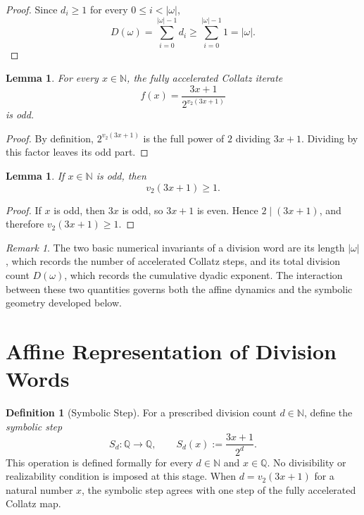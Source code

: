\documentclass[12pt, oneside]{article}
\numberwithin{equation}{section}
\theoremstyle{definition}
\newtheorem{definition}{Definition}[section]
\theoremstyle{plain}
\newtheorem{lemma}[theorem]{Lemma}
\theoremstyle{remark}
\newtheorem*{remark}{Remark}
\begin{document}
\begin{proof}
Since $d_i\ge1$ for every $0\le i<|\omega|$,
\[
D(\omega)
=\sum_{i=0}^{|\omega|-1} d_i
\ge
\sum_{i=0}^{|\omega|-1}1
=
|\omega|.
\]
\end{proof}

\begin{lemma}
For every \(x\in\mathbb{N}\), the fully accelerated Collatz iterate
\[
f(x)=\frac{3x+1}{2^{v_2(3x+1)}}
\]
is odd.
\end{lemma}

\begin{proof}
By definition, \(2^{v_2(3x+1)}\) is the full power of \(2\) dividing
\(3x+1\). Dividing by this factor leaves its odd part.
\end{proof}

\begin{lemma}
If \(x\in\mathbb{N}\) is odd, then
\[
v_2(3x+1)\ge 1.
\]
\end{lemma}

\begin{proof}
If \(x\) is odd, then \(3x\) is odd, so \(3x+1\) is even. Hence
\(2\mid(3x+1)\), and therefore \(v_2(3x+1)\ge1\).
\end{proof}

\begin{remark}
The two basic numerical invariants of a division word are its length
\(|\omega|\), which records the number of accelerated Collatz steps, and
its total division count \(D(\omega)\), which records the cumulative
dyadic exponent. The interaction between these two quantities governs
both the affine dynamics and the symbolic geometry developed below.
\end{remark}


\section{Affine Representation of Division Words}
\label{sec:affine-representation}

\begin{definition}[Symbolic Step]

For a prescribed division count \(d\in\mathbb{N}\), define the
\emph{symbolic step}
\[
S_d:\mathbb{Q}\to\mathbb{Q},
\qquad
S_d(x):=\frac{3x+1}{2^d}.
\]
This operation is defined formally for every \(d\in\mathbb{N}\) and
\(x\in\mathbb{Q}\). No divisibility or realizability condition is imposed
at this stage. When \(d=v_2(3x+1)\) for a natural number \(x\), the
symbolic step agrees with one step of the fully accelerated Collatz map.
\end{definition}
\end{document}
